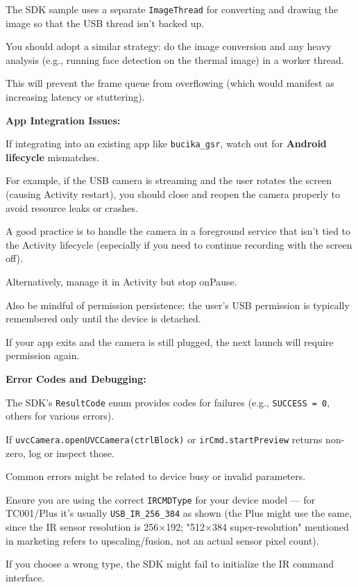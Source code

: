 {The SDK sample uses a separate \texttt{ImageThread} for converting and drawing the image so that the USB thread isn't backed up.

You should adopt a similar strategy: do the image conversion and any heavy analysis (e.g., running face detection on the thermal image) in a worker thread.

This will prevent the frame queue from overflowing (which would manifest as increasing latency or stuttering).

\item \textbf{App Integration Issues:}

If integrating into an existing app like \texttt{bucika_gsr}, watch out for \textbf{Android lifecycle}
 mismatches.

For example, if the USB camera is streaming and the user rotates the screen (causing Activity restart), you should close and reopen the camera properly to avoid resource leaks or crashes.

A good practice is to handle the camera in a foreground service that isn't tied to the Activity lifecycle (especially if you need to continue recording with the screen off).

Alternatively, manage it in Activity but stop onPause.

Also be mindful of permission persistence: the user's USB permission is typically remembered only until the device is detached.

If your app exits and the camera is still plugged, the next launch will require permission again.

\item \textbf{Error Codes and Debugging:}

The SDK's \texttt{ResultCode} enum provides codes for failures (e.g., \texttt{SUCCESS = 0}, others for various errors).

If \texttt{uvcCamera.openUVCCamera(ctrlBlock)} or \texttt{irCmd.startPreview} returns non-zero, log or inspect those.

Common errors might be related to device busy or invalid parameters.

Ensure you are using the correct \texttt{IRCMDType} for your device model --- for TC001/Plus it's usually \texttt{USB_IR_256_384} as shown (the Plus might use the same, since the IR sensor resolution is 256×192; "512×384 super-resolution" mentioned in marketing refers to upscaling/fusion, not an actual sensor pixel count).

If you choose a wrong type, the SDK might fail to initialize the IR command interface.

}
